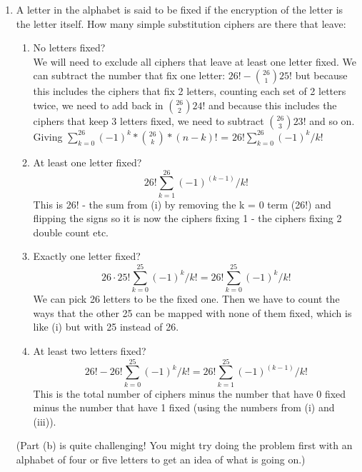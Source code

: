 \documentclass[12pt]{amsart}
\theoremstyle{definition}
\begin{document}
\begin{enumerate}
\begin{enumerate}
			\item  A letter in the alphabet is said to be fixed if the encryption of the letter is the
				letter itself. How many simple substitution ciphers are there that leave:
		
			\begin{enumerate}
				\item No letters fixed? 
				\\ We will need to exclude all ciphers that leave at least one letter fixed. We can subtract the number that fix one letter: $26! - {26 \choose 1} 25!$ 
				but because this includes the ciphers that fix 2 letters, counting each set of 2 letters twice, we need to add back in ${26 \choose 2}24!$ and because this includes
				the ciphers that keep 3 letters fixed, we need to subtract ${26 \choose 3}23!$ and so on. 
				Giving $\sum_{k=0}^{26}{(-1)^k * {26 \choose k}*(n-k)!}$ = $26!\sum_{k=0}^{26}{(-1)^k/ k!}$

				\item At least one letter fixed?  $$26!\sum_{k=1}^{26}{(-1)^{(k-1)}/k!}$$
				This is 26! - the sum from (i) by removing the k = 0 term (26!) and flipping the signs so it is now the ciphers fixing 1 - the ciphers fixing 2 double count etc. \\
				\item Exactly one letter fixed?
				$$26 \cdot 25!\sum_{k=0}^{25}{(-1)^k/ k!} = 26!\sum_{k=0}^{25}{(-1)^k/ k!}$$
				We can pick 26 letters to be the fixed one. Then we have to count the ways that the other 25 can be mapped with none of them fixed, which is like (i) but with 25 instead of 26.\\
				\item At least two letters fixed?
				$$26!- 26!\sum_{k=0}^{25}{(-1)^k/ k!} = 26!\sum_{k=1}^{25}{(-1)^{(k-1)}/ k!}$$
				This is the total number of ciphers minus the number that have 0 fixed minus the number that have 1 fixed (using the numbers from (i) and (iii)).\\
				
			\end{enumerate}
			(Part (b) is quite challenging! You might try doing the problem first with an alphabet 
			of four or five letters to get an idea of what is going on.)
		\end{enumerate}
\end{enumerate}
\end{document}
